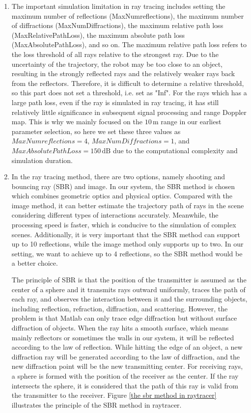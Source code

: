 \documentclass[12pt,DIV14,BCOR12mm,a4paper,footinclude=false,headinclude,parskip=half-,twoside,openright,cleardoublepage=empty,toc=index,bibliography=totoc,listof=totoc]{scrreprt}
\numberwithin{equation}{chapter}
\begin{document}
\begin{enumerate}[label=\textbullet]
    \item The important simulation limitation in ray tracing includes setting the maximum number of reflections (MaxNumreflections), the maximum number of diffractions (MaxNumDiffractions), the maximum relative path loss (MaxRelativePathLoss), the maximum absolute path loss (MaxAbsolutePathLoss), and so on. The maximum relative path loss refers to the loss threshold of all rays relative to the strongest ray. Due to the uncertainty of the trajectory, the robot may be too close to an object, resulting in the strongly reflected rays and the relatively weaker rays back from the reflectors. Therefore, it is difficult to determine a relative threshold, so this part does not set a threshold, i.e. set as "Inf". For the rays which has a large path loss, even if the ray is simulated in ray tracing, it has still relatively little significance in subsequent signal processing and range Doppler map. This is why we mainly focused on the $10\,\mathrm{m}$ range in our earliest parameter selection, so here we set these three values as $MaxNumreflections = 4$, $MaxNumDiffractions = 1$, and $MaxAbsolutePathLoss = 150\,\mathrm{dB}$ due to the computational complexity and simulation duration.

    \item In the ray tracing method, there are two options, namely shooting and bouncing ray (SBR) and image. In our system, the SBR method \cite{ray_tracer_inputs} is chosen which combines geometric optics and physical optics. Compared with the image method, it can better estimate the trajectory path of rays in the scene considering different types of interactions accurately. Meanwhile, the processing speed is faster, which is conducive to the simulation of complex scenes. Additionally, it is very important that the SBR method can support up to 10 reflections, while the image method only supports up to two. In our setting, we want to achieve up to 4 reflections, so the SBR method would be a better choice.

    The principle of SBR is that the position of the transmitter is assumed as the center of a sphere and it transmits rays outward uniformly, traces the path of each ray, and observes the interaction between it and the surrounding objects, including reflection, refraction, diffraction, and scattering. However, the problem is that Matlab can only trace edge diffraction but without surface diffraction of objects. When the ray hits a smooth surface, which means mainly reflectors or sometimes the walls in our system, it will be reflected according to the law of reflection. While hitting the edge of an object, a new diffraction ray will be generated according to the law of diffraction, and the new diffraction point will be the new transmitting center. For receiving rays, a sphere is formed with the position of the receiver as the center. If the ray intersects the sphere, it is considered that the path of this ray is valid from the transmitter to the receiver. Figure \ref{the sbr method in raytracer} illustrates the principle of the SBR method in raytracer.


\end{enumerate}
\end{document}
